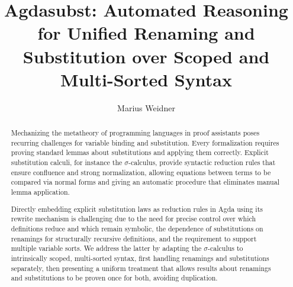 \documentclass[screen,nonacm]{acmart}
\begin{document}
\title{Agdasubst: Automated Reasoning for Unified Renaming and Substitution over Scoped and Multi-Sorted Syntax}

\author{Marius Weidner}

\begin{abstract}

      Mechanizing the metatheory of programming languages in proof assistants poses
      recurring challenges for variable binding and substitution. Every formalization
      requires proving standard lemmas about substitutions and applying them
      correctly. Explicit substitution calculi, for instance the $\sigma$-calculus,
      provide syntactic reduction rules that ensure confluence and strong
      normalization, allowing equations between terms to be compared via normal forms
      and giving an automatic procedure that eliminates manual lemma application.

      Directly embedding explicit substitution laws as reduction rules in Agda using
      its rewrite mechanism is challenging due to the need for precise control over
      which definitions reduce and which remain symbolic, the dependence of
      substitutions on renamings for structurally recursive definitions, and the
      requirement to support multiple variable sorts. We address the latter by
      adapting the $\sigma$-calculus to intrinsically scoped, multi-sorted syntax,
      first handling renamings and substitutions separately, then presenting a
      uniform treatment that allows results about renamings and substitutions to be
      proven once for both, avoiding duplication.
\end{abstract}
\end{document}
